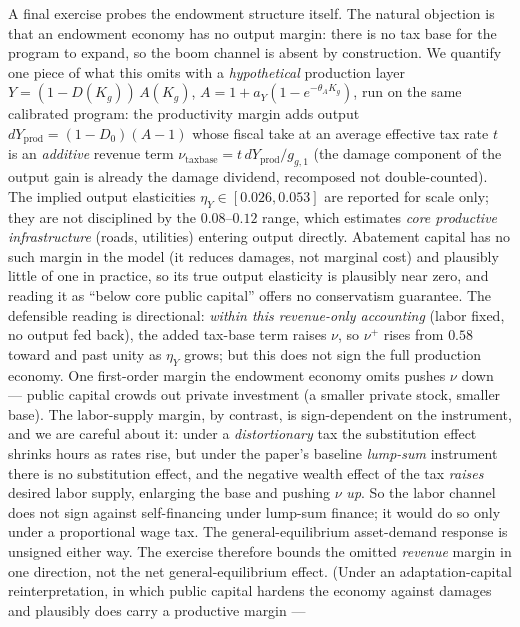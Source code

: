 \documentclass[12pt]{article}
\begin{document}
A final exercise probes the endowment structure itself. The natural
objection is that an endowment economy has no output margin: there is no tax
base for the program to expand, so the \citet{angeletos2024deficits} boom
channel is absent by construction. We quantify one
piece of what this omits with a \emph{hypothetical} production layer
$Y = (1-D(K_g))\,A(K_g)$, $A = 1 + a_Y(1 - e^{-\theta_A K_g})$, run on the
same calibrated program: the productivity margin adds output
$dY_{\mathrm{prod}} = (1-D_0)(A-1)$ whose fiscal take at an average
effective tax rate $t$ is an \emph{additive} revenue term
$\nu_{\mathrm{taxbase}} = t\, dY_{\mathrm{prod}}/g_{g,1}$ (the damage
component of the output gain is already the damage dividend, recomposed not
double-counted). The implied output elasticities $\eta_Y\in[0.026,0.053]$
are reported for scale only; they are not disciplined by the
\citet{bomligthart2014} $0.08$--$0.12$ range, which estimates \emph{core
productive infrastructure} (roads, utilities) entering output directly.
Abatement capital has no such margin in the model (it
reduces damages, not marginal cost) and plausibly little of one in
practice, so its true output elasticity is
plausibly near zero, and reading it as ``below core public capital'' offers
no conservatism guarantee. The defensible reading is directional: \emph{within this
revenue-only accounting} (labor fixed, no output fed back), the added
tax-base term raises $\nu$, so $\nu^{+}$ rises from $0.58$ toward and past
unity as $\eta_Y$ grows; but this does not sign the full production economy.
One first-order margin the endowment economy omits pushes $\nu$
down --- public capital crowds out private investment (a smaller
private stock, smaller base). The labor-supply margin, by contrast, is
sign-dependent on the instrument, and we are careful about it: under a
\emph{distortionary} tax the substitution effect shrinks hours as rates
rise, but under the paper's baseline \emph{lump-sum} instrument there is no
substitution effect, and the negative wealth effect of the tax \emph{raises}
desired labor supply, enlarging the base and pushing $\nu$ \emph{up}. So the
labor channel does not sign against self-financing under lump-sum finance;
it would do so only under a proportional wage tax. The general-equilibrium
asset-demand response is unsigned either way. The exercise therefore bounds
the omitted \emph{revenue} margin in one direction, not the net
general-equilibrium effect. (Under an
adaptation-capital reinterpretation, in which public capital hardens the
economy against damages and plausibly does carry a productive margin ---
\end{document}
